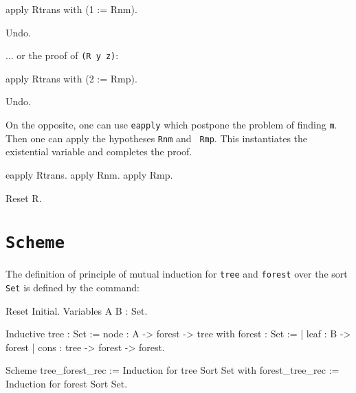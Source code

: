 \begin{coq_example*}
\begin{coq_example}

  apply Rtrans with (1 := Rnm).
\end{coq_example}

\begin{coq_eval}
Undo.
\end{coq_eval}

... or the proof of {\tt (R y z)}:

\begin{coq_example}

  apply Rtrans with (2 := Rmp).
\end{coq_example}

\begin{coq_eval}
Undo.
\end{coq_eval}

On the opposite, one can use {\tt eapply} which postpone the problem
of finding {\tt m}. Then one can apply the hypotheses {\tt Rnm} and {\tt
Rmp}. This instantiates the existential variable and completes the proof.

\begin{coq_example}
eapply Rtrans.
apply Rnm.
apply Rmp.
\end{coq_example}

\begin{coq_eval}
Reset R.
\end{coq_eval}

\section[{\tt Scheme}]{{\tt Scheme}
\label{Scheme-examples}}

\firstexample
{}

The definition of principle of mutual induction for {\tt tree} and
{\tt forest} over the sort {\tt Set} is defined by the command:

\begin{coq_eval}
Reset Initial.
Variables A B : 
              Set.
\end{coq_eval}

\begin{coq_example*}
Inductive tree : Set :=
    node : A -> forest -> tree
with forest : Set :=
  | leaf : B -> forest
  | cons : tree -> forest -> forest.

Scheme tree_forest_rec := Induction for tree Sort Set
  with forest_tree_rec := Induction for forest Sort Set.
\end{coq_example*}


\end{coq_example*}
